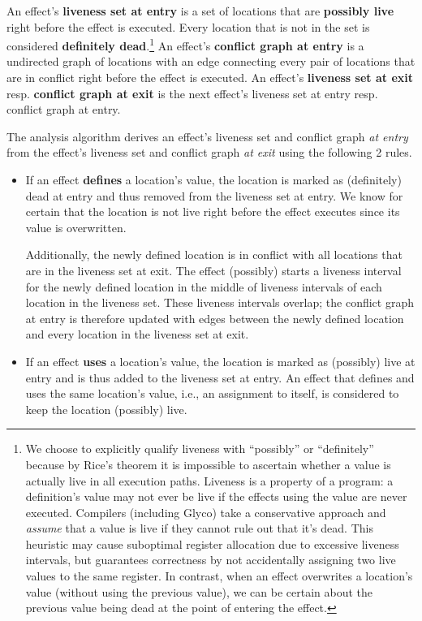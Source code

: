 \documentclass[main.tex]{subfiles}
\begin{document}
An effect's \textbf{liveness set at entry} is a set of locations that are \textbf{possibly live} right before the effect is executed. Every location that is not in the set is considered \textbf{definitely dead}.\footnote{We choose to explicitly qualify liveness with \enquote{possibly} or \enquote{definitely} because by Rice's theorem it is impossible to ascertain whether a value is actually live in all execution paths. Liveness is a property of a program: a definition's value may not ever be live if the effects using the value are never executed. Compilers (including Glyco) take a conservative approach and \emph{assume} that a value is live if they cannot rule out that it's dead. This heuristic may cause suboptimal register allocation due to excessive liveness intervals, but guarantees correctness by not accidentally assigning two live values to the same register. In contrast, when an effect overwrites a location's value (without using the previous value), we can be certain about the previous value being dead at the point of entering the effect.} An effect's \textbf{conflict graph at entry} is a undirected graph of locations with an edge connecting every pair of locations that are in conflict right before the effect is executed. An effect's \textbf{liveness set at exit} resp. \textbf{conflict graph at exit} is the next effect's liveness set at entry resp. conflict graph at entry.

The analysis algorithm derives an effect's liveness set and conflict graph \emph{at entry} from the effect's liveness set and conflict graph \emph{at exit} using the following 2 rules.

\begin{itemize}
	
	\item If an effect \textbf{defines} a location's value, the location is marked as (definitely) dead at entry and thus removed from the liveness set at entry. We know for certain that the location is not live right before the effect executes since its value is overwritten.
	
	Additionally, the newly defined location is in conflict with all locations that are in the liveness set at exit. The effect (possibly) starts a liveness interval for the newly defined location in the middle of liveness intervals of each location in the liveness set. These liveness intervals overlap; the conflict graph at entry is therefore updated with edges between the newly defined location and every location in the liveness set at exit.
	
	\item If an effect \textbf{uses} a location's value, the location is marked as (possibly) live at entry and is thus added to the liveness set at entry. An effect that defines and uses the same location's value, i.e., an assignment to itself, is considered to keep the location (possibly) live.
	
\end{itemize}
\end{document}
